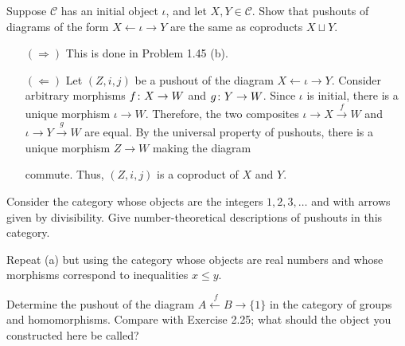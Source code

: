\bs
\es

\bx
Suppose $\mathcal{C}$ has an initial object $\iota$, and let $X, Y \in \mathcal{C}$. Show that pushouts of diagrams of the form $X \leftarrow \iota \to Y$ are the same as coproducts $X \sqcup Y$.
\ex

\bs
\begin{itemize}
\item[$(\Rightarrow)$]
This is done in Problem 1.45 (b).
\item[$(\Leftarrow)$]
Let $(Z,i,j)$ be a pushout of the diagram $X \leftarrow \iota \to Y$. Consider arbitrary morphisms $f\colon X\to W$ and $g\colon Y\to W$. Since $\iota$ is initial, there is a unique morphism $\iota\to W$. Therefore, the two composites $\iota \to X\xrightarrow{\,f\,}W$ and $\iota \to Y\xrightarrow{\,g\,}W$ are equal. By the universal property of pushouts, there is a unique morphism $Z\to W$ making the diagram 
\bse
{}
\ese
commute. Thus, $(Z,i,j)$ is a coproduct of $X$ and $Y$. 
\end{itemize}
\es

\bx
\ben[label=(\alph*)]
\item Consider the category whose objects are the integers $1, 2, 3, \ldots$ and with arrows given by divisibility. Give number-theoretical descriptions of pushouts in this category.
\item Repeat (a) but using the category whose objects are real numbers and whose morphisms correspond to inequalities $x \leq y$.
\een
\ex

\bs
\ben[label=(\alph*)]
\item 
\item 
\een
\es

\bx
Determine the pushout of the diagram $A\xleftarrow{\ f} B\to\{1\}$ in the category of groups and homomorphisms. Compare with Exercise 2.25; what should the object you constructed here be called?
\ex

